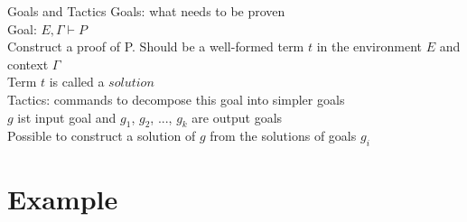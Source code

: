 \begin{frame}{Goals and Tactics}
	Goals: what needs to be proven\\
	\medskip
	\pause
	Goal: $E, \Gamma \vdash P$\\
	\pause
	Construct a proof of P. Should be a well-formed term $t$ in the environment $E$ and context $\Gamma$\\
	\pause
	Term $t$ is called a $solution$\\
	\pause
	\bigskip
	Tactics: commands to decompose this goal into simpler goals\\
	\pause
	\medskip
	$g$ ist input goal and $g_1$, $g_2$, ..., $g_k$ are output goals\\
	\pause
	Possible to construct a solution of $g$ from the solutions of goals $g_i$	
\end{frame}

\section{Example}

